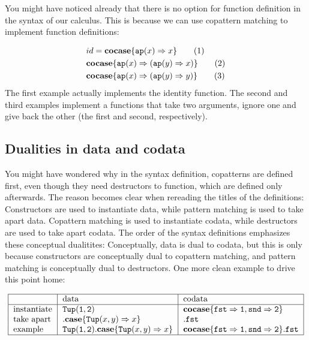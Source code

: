 \documentclass[twoside,12pt,a4paper]{article}
\begin{document}
You might have noticed already that there is no option for function definition in the syntax of our calculus.
This is because we can use copattern matching to implement function definitions:
\begin{example}
    \begin{align*}
        &id = \textbf{cocase}\{\texttt{ap}(x)\Rightarrow x\}\tag{1}\\
        &\textbf{cocase}\{\texttt{ap}(x)\Rightarrow (\texttt{ap}(y)\Rightarrow x)\} \tag{2} \\
        &\textbf{cocase}\{\texttt{ap}(x)\Rightarrow (\texttt{ap}(y)\Rightarrow y)\} \tag{3}
    \end{align*}
    The first example actually implements the identity function. 
    The second and third examples implement a functions that take two arguments, ignore one and give back the other (the first and second, respectively).
\end{example}

\subsection{Dualities in data and codata}
You might have wondered why in the syntax definition, copatterns are defined first, even though they need destructors to function, which are defined only afterwards.
The reason becomes clear when rereading the titles of the definitions:
Constructors are used to instantiate data, while pattern matching is used to take apart data.
Copattern matching is used to instantiate codata, while destructors are used to take apart codata.
The order of the syntax definitions emphasizes these conceptual dualitites:
Conceptually, data is dual to codata, but this is only because constructors are conceptually dual to copattern matching, 
and pattern matching is conceptually dual to destructors.
One more clean example to drive this point home:  

\begin{example}
    \begin{align*}
        \begin{tabular}{|l | l | l|}
            \hline
            & data & codata\\
            \hline
            instantiate & $\mathtt{Tup(1,2)}$&  $\excopatmatch{\mathtt{fst\Rightarrow 1, snd\Rightarrow 2}}$\\
            take apart & $.\expatmatch{\mathttbrackets{Tup}{x, y}\Rightarrow x}$ & $.\mathtt{fst}$\\
            example & $\mathtt{Tup(1,2)}.\expatmatch{\mathttbrackets{Tup}{x, y}\Rightarrow x}$&$\excopatmatch{\mathtt{fst\Rightarrow 1, snd\Rightarrow 2}}.\mathtt{fst}$\\
           \hline
       \end{tabular}
    \end{align*}        
\end{example} %
\end{document}
